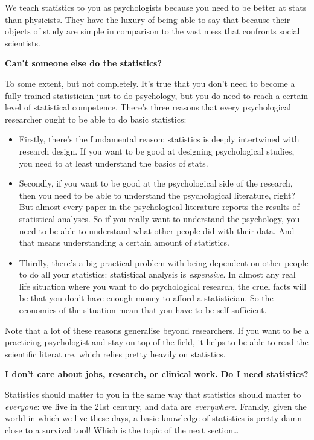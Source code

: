 \documentclass[
  11pt,
]{book}
\providecommand{\tightlist}{%
  \setlength{\itemsep}{0pt}\setlength{\parskip}{0pt}}
\theoremstyle{definition}
\theoremstyle{definition}
\theoremstyle{definition}
\theoremstyle{definition}
\theoremstyle{remark}
\begin{document}
We teach statistics to you as psychologists because you need to be better at stats than physicists. They have the luxury of being able to say that because their objects of study are simple in comparison to the vast mess that confronts social scientists.

\textbf{Can't someone else do the statistics?}

To some extent, but not completely. It's true that you don't need to become a fully trained statistician just to do psychology, but you do need to reach a certain level of statistical competence. There's three reasons that every psychological researcher ought to be able to do basic statistics:

\begin{itemize}
\tightlist
\item
  Firstly, there's the fundamental reason: statistics is deeply intertwined with research design. If you want to be good at designing psychological studies, you need to at least understand the basics of stats.
\item
  Secondly, if you want to be good at the psychological side of the research, then you need to be able to understand the psychological literature, right? But almost every paper in the psychological literature reports the results of statistical analyses. So if you really want to understand the psychology, you need to be able to understand what other people did with their data. And that means understanding a certain amount of statistics.
\item
  Thirdly, there's a big practical problem with being dependent on other people to do all your statistics: statistical analysis is \emph{expensive}. In almost any real life situation where you want to do psychological research, the cruel facts will be that you don't have enough money to afford a statistician. So the economics of the situation mean that you have to be self-sufficient.
\end{itemize}

Note that a lot of these reasons generalise beyond researchers. If you want to be a practicing psychologist and stay on top of the field, it helps to be able to read the scientific literature, which relies pretty heavily on statistics.

\textbf{I don't care about jobs, research, or clinical work. Do I need statistics?}

Statistics should matter to you in the same way that statistics should matter to \emph{everyone}: we live in the 21st century, and data are \emph{everywhere}. Frankly, given the world in which we live these days, a basic knowledge of statistics is pretty damn close to a survival tool! Which is the topic of the next section\ldots{}
\end{document}
